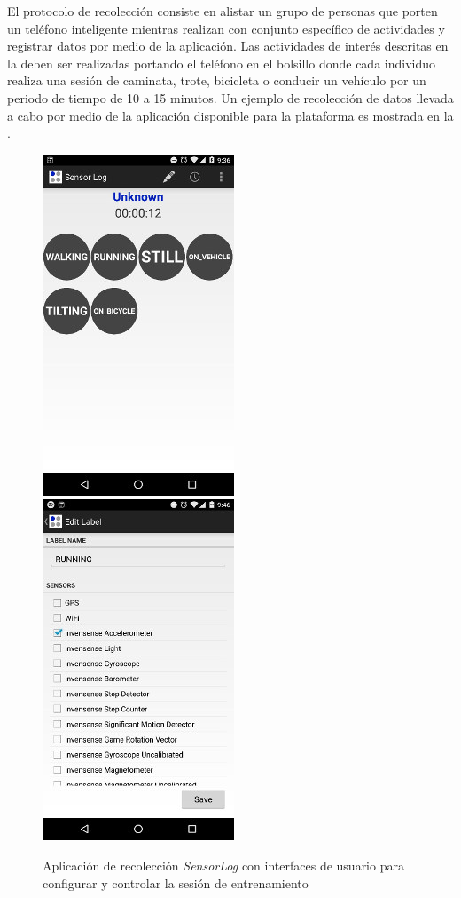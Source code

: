 El protocolo de recolección consiste en alistar un grupo de personas
que porten un teléfono inteligente mientras realizan con conjunto
específico de actividades y registrar datos por medio de la aplicación.
Las actividades de interés descritas en la 
deben ser realizadas portando el teléfono en el bolsillo donde cada
individuo realiza una sesión de caminata, trote, bicicleta o conducir
un vehículo por un periodo de tiempo de 10 a 15 minutos. Un ejemplo
de recolección de datos llevada a cabo por medio de la aplicación
disponible para la plataforma  es mostrada en la . 

\begin{figure}[!tbph]
\begin{centering}
\includegraphics[scale=0.7]{capitulo-4/graphics/sensorlog1} \includegraphics[scale=0.7]{capitulo-4/graphics/sensorlog2}
\par\end{centering}
\caption[Aplicación de recolección \emph{SensorLog}]{\label{fig4:sensor-log}Aplicación de recolección \emph{SensorLog
}con interfaces de usuario para configurar y controlar la sesión de
entrenamiento}
\end{figure}

